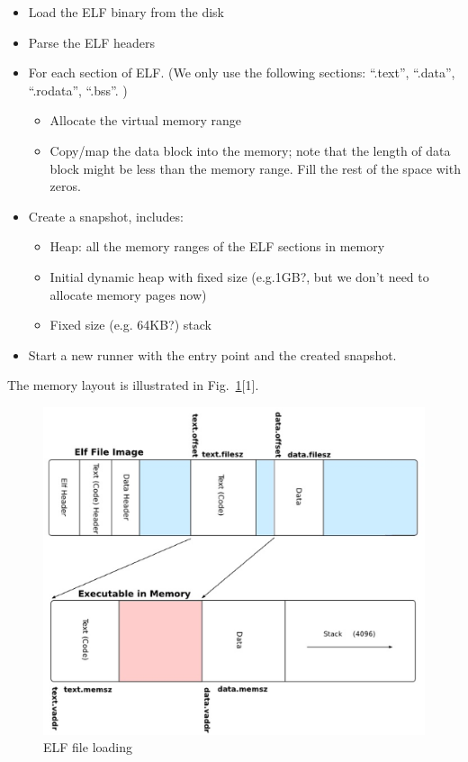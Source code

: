 \documentclass[a4paper]{article}
\begin{document}
\begin{itemize}
	\item Load the ELF binary from the disk
	\item Parse the ELF headers
	\item For each section of ELF. (We only use the following sections: “.text”, “.data”, “.rodata”, “.bss”. )
		\begin{itemize}
			\item Allocate the virtual memory range 
			\item Copy/map the data block into the memory; note that the length of data block might be less than the memory range. Fill the rest of the space with zeros.
		\end{itemize}
	\item Create a snapshot, includes:
		\begin{itemize}
			\item Heap: all the memory ranges of the ELF sections in memory
			\item Initial dynamic heap with fixed size (e.g.1GB?, but we don’t need to allocate memory pages now)
			\item Fixed size (e.g. 64KB?) stack
		\end{itemize}
	\item Start a new runner with the entry point and the created snapshot.
\end{itemize}

The memory layout is illustrated in Fig.~\ref{fig:c0-elf}[1].\\

\begin{figure}[htbp]
\begin{center}
  \includegraphics[width=5.8in]{figure/elf.eps}
  \caption{ELF file loading}
  \label{fig:c0-elf}
\end{center}
\end{figure}
\end{document}
